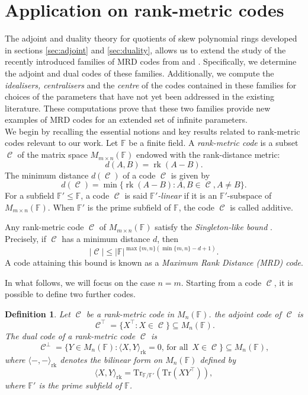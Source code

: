 \documentclass[a4paper, 11pt]{article}
\DeclareMathOperator{\C}{\mathcal{C}}
\DeclareMathOperator{\rk}{rk}
\newtheorem{definition}[theorem]{Definition}
\newcommand{\F}{{\mathbb F}}
\begin{document}
\section{Application on rank-metric codes}



The adjoint and duality theory for quotients of skew polynomial rings developed in sections \ref{sec:adjoint} and \ref{sec:duality}, allows us to extend the study of the recently introduced families of MRD codes from \cite{sheekey2020new} and \cite{lobillo2025quotients}. Specifically, we determine the adjoint and dual codes of these families. Additionally, we compute the \emph{idealisers, centralisers} and the \emph{centre} of the codes contained in these families for choices of the parameters that have not yet been addressed in the existing literature. These computations prove that these two families provide new examples of MRD codes for an extended set of infinite parameters. \\

We begin by recalling the essential notions and key results related to rank-metric codes relevant to our work. Let $\F$ be a finite field. A \emph{rank-metric code} is a subset $\C$ of the matrix space $M_{m \times n}(\F)$ endowed with the rank-distance metric:
\[
d(A,B) = \rk(A-B).
\]
The minimum distance $d(\C)$ of a code $\C $ is given by
\[
d(\C)=\min\{\rk(A-B) \colon A,B\in \C, A\ne B\}.
\]
For a subfield $\F'\leq \F$, a code $\C$ is said \emph{$\F'$-linear} if it is an $\F'$-subspace of $M_{m\times n}(\F)$. When $\F'$ is the prime subfield of $\F$, the code $\C$ is called additive. 

Any rank-metric code $\C$ of $M_{m\times n}(\F)$ satisfy the \emph{Singleton-like bound} \cite{delsarte1978bilinear}. Precisely, if $\C$ has a minimum distance $d$, then
\begin{equation} \label{eq:singleton}
|\C|\leq |\F|^{\max\{m,n\}(\min\{m,n\}-d+1)}.
\end{equation}
A code attaining this bound is known as a \emph{Maximum Rank Distance (MRD) code}. 


In what follows, we will focus on the case $n=m$. Starting from a code $\C$, it is possible to define two further codes. 

\begin{definition}
    Let $\C$ be a rank-metric code in $M_n(\F)$. the \emph{adjoint code} of $\C$ is
\[ \C^\top =\{X^{\top} \colon X \in \C\} \subseteq M_n(\F). \]
 The \emph{dual code} of a rank-metric code $\C$ is
\[ \C^\perp = \{ Y \in M_n(\F) \colon \langle X,Y \rangle_{\rk}=0, \, \text{for all } \, X \in \C \} \subseteq M_n(\F), \]
where $\langle -,- \rangle_{\rk}$ denotes the bilinear form on $M_n(\F)$ defined by
\begin{equation} \label{eq:bilinearrank}
\langle X,Y \rangle_{\rk}= \mathrm{Tr}_{\F/\F'}\left(\mathrm{Tr}(XY^{\top})\right), 
\end{equation} 
where $\F'$ is the prime subfield of $\F$.
\end{definition}
\end{document}
